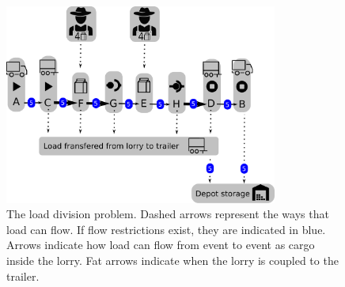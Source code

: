 



\begin{figure}[!h]
  \centering
    \includegraphics[width=0.8\textwidth]{img/trivial_flow_v2.pdf}
  \caption{The load division problem. Dashed arrows represent the ways that load can flow. If flow restrictions exist, they are indicated in blue.
 Arrows indicate how load can flow from event to event as cargo inside the lorry.
 Fat arrows indicate when the lorry is coupled to the trailer.}
  \label{fig:flow}
\end{figure}

